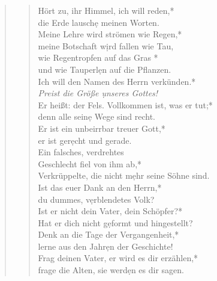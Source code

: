 
\def\greinitialformat#1{{\fontsize{40}{40}\selectfont #1}}
\gresetfirstlineaboveinitial{\small \textcolor{red}{Deut 32}}{}
\setaboveinitialseparation{0.72mm}

\vspace{0.3cm}

\begin{quote}
\begin{verse}

 
Hört zu, ihr Himmel, ich will reden,*\\
die Erde lausch\d e meinen Worten.\\
\vin Meine Lehre wird strömen wie Regen,*\\
\vin meine Botschaft w\d ird fallen wie Tau,\\
wie Regentropfen auf das Gras *\\
und wie Tauperl\d en auf die Pflanzen.\\
\vin Ich will den Namen des Herrn verkünden.*\\
\vin \textit{Preist die Größe \d unseres Gottes!}\\
Er heißt: der Fels. Vollkommen  ist, was er tut;*\\
denn alle sein\d e Wege sind recht.\\
\vin Er ist ein unbeirrbar treuer Gott,*\\
\vin er ist ger\d echt und gerade.\\
Ein falsches, verdrehtes \\  Geschlecht fiel von ihm ab,*\\
Verkrüppelte, die nicht m\d ehr seine Söhne sind.\\
\vin Ist das euer Dank an den Herrn,*\\
\vin du dummes, v\d erblendetes Volk?\\
Ist er nicht dein Vater, dein Schöpfer?*\\
Hat er dich nicht g\d eformt und hingestellt? \\

Denk an die Tage der Vergangenheit,*\\
lerne aus den Jahr\d en der Geschichte!\\
\vin Frag deinen Vater, er wird es dir erzählen,*\\
\vin frage die Alten, sie werd\d en es dir sagen. \\


\end{verse}
\end{quote}
